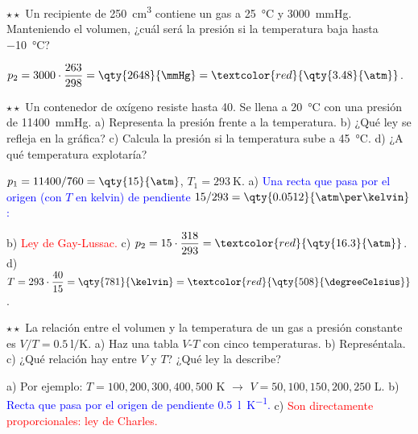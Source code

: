 \begin{exercise}
    \(\star\star\) Un recipiente de \qty{250}{\cubic\centi\metre} contiene un gas a \qty{25}{\degreeCelsius} y \qty{3000}{\mmHg}.
    Manteniendo el volumen, ¿cuál será la presión si la temperatura baja hasta \qty{-10}{\degreeCelsius}?
    \begin{solu}
        \(p_2 = 3000 \cdot \dfrac{263}{298} = \qty{2648}{\mmHg} = \textcolor{red}{\qty{3.48}{\atm}}\).
    \end{solu}
\end{exercise}

\begin{exercise}
    \(\star\star\) Un contenedor de oxígeno resiste hasta \qty{40}{\atm}. Se llena a \qty{20}{\degreeCelsius} con una presión de
    \qty{11400}{\mmHg}. a) Representa la presión frente a la temperatura. b) ¿Qué ley se refleja en la gráfica? c) Calcula la
    presión si la temperatura sube a \qty{45}{\degreeCelsius}. d) ¿A qué temperatura explotaría?
    \begin{solu}
        \(p_1 = 11400/760 = \qty{15}{\atm}\), \(T_1 = \qty{293}{\kelvin}\).
        a) \textcolor{blue}{Una recta que pasa por el origen (con \(T\) en kelvin) de pendiente \(15/293 = \qty{0.0512}{\atm\per\kelvin}\):}
        \begin{center}
        \end{center}
        b) \textcolor{red}{Ley de Gay-Lussac.} c) \(p_2 = 15 \cdot \dfrac{318}{293} = \textcolor{red}{\qty{16.3}{\atm}}\).
        d) \(T = 293 \cdot \dfrac{40}{15} = \qty{781}{\kelvin} = \textcolor{red}{\qty{508}{\degreeCelsius}}\).
    \end{solu}
\end{exercise}

\begin{exercise}
    \(\star\star\) La relación entre el volumen y la temperatura de un gas a presión constante es \(V/T = \qty{0.5}{\litre\per\kelvin}\).
    a) Haz una tabla \(V\)-\(T\) con cinco temperaturas. b) Represéntala. c) ¿Qué relación hay entre \(V\) y \(T\)? ¿Qué ley la describe?
    \begin{solu}
        a) Por ejemplo: \(T = 100, 200, 300, 400, 500\) K \(\rightarrow\) \(V = 50, 100, 150, 200, 250\) L.
        b) \textcolor{blue}{Recta que pasa por el origen de pendiente \qty{0.5}{\litre\per\kelvin}.}
        c) \textcolor{red}{Son directamente proporcionales: ley de Charles.}
    \end{solu}
\end{exercise}


